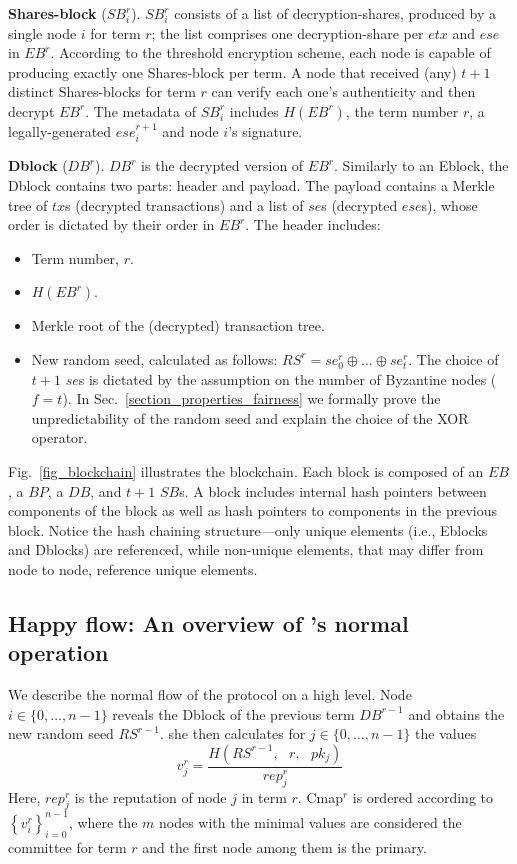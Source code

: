 \textbf{Shares-block} ($SB^r_i$).
$SB^r_i$ consists of a list of decryption-shares, produced by a single node $i$ for term $r$; 
the list comprises one decryption-share per $etx$ and $ese$ in $EB^r$. According to the threshold encryption scheme, each node is capable of producing exactly one Shares-block per term. A node that received (any) $t+1$ distinct Shares-blocks for term $r$ can verify each one's authenticity and then decrypt $EB^r$. The metadata of $SB_i^r$ includes $H(EB^r)$, the term number $r$, a legally-generated $ese^{r+1}_i$ and node $i$'s signature.

\textbf{Dblock} ($DB^r$).
$DB^r$ is the decrypted version of $EB^r$. Similarly to an Eblock, the Dblock contains two parts: header and payload. The payload contains a Merkle tree of $tx$s (decrypted transactions) and a list of $se$s (decrypted $ese$s), whose order is dictated by their order in $EB^r$. The header includes:
\begin{itemize}
\item Term number, $r$.
\item $H(EB^r)$.
\item Merkle root of the (decrypted) transaction tree.
\item New random seed, calculated as follows: $RS^r=se^r_0 \oplus \dots \oplus se^r_{t}$. The choice of $t+1$ $se$s is dictated by the assumption on the number of Byzantine nodes ($f=t$). In Sec.~\ref{section_properties_fairness} we formally prove the unpredictability of the random seed and explain the choice of the XOR operator. 
\end{itemize}


Fig.~\ref{fig_blockchain} illustrates the \name blockchain. Each block is composed of an $EB$, a $BP$, a $DB$, and $t+1$ $SB$s. A block includes internal hash pointers between components of the block as well as hash pointers to components in the previous block. Notice the \name hash chaining structure---only unique elements (i.e., Eblocks and Dblocks) are referenced, while non-unique elements, that may differ from node to node, reference unique elements.

\subsection{Happy flow: An overview of \nameNS's normal operation}
We describe the normal flow of the protocol on a high level. 
Node $i \in \{0,\dots,n-1 \}$ reveals the Dblock of the previous term $DB^{r-1}$ and obtains the new random seed $RS^{r-1}$. she then calculates for $j \in \{0,\dots,n-1 \}$ the values
\begin{equation*}
v_j^r = \frac{H \left( RS^{r-1}, \text{ } r, \text{ } pk_j \right)}{rep_j^r}
\end{equation*}
Here, $rep_j^r$ is the reputation of node $j$ in term $r$. 
Cmap$^r$ is ordered according to $\left\{ v_i^r\right\}_{i=0}^{n-1}$, where the $m$ nodes with the minimal values are considered the committee for term $r$ and the first node among them is the primary. 


